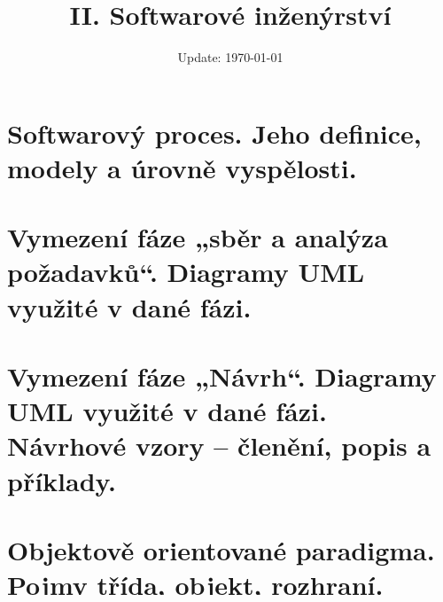 \documentclass[11pt]{article}
\title{\textbf{II. Softwarové inženýrství}}
\date{\small\vspace{-9ex}Update: \today}
\begin{document}
\maketitle
\setcounter{tocdepth}{1}
\tableofcontents
\pagebreak

\section{Softwarový proces. Jeho definice, modely a úrovně vyspělosti.}


\pagebreak
\section{Vymezení fáze „sběr a analýza požadavků“. Diagramy UML využité v dané fázi.}


\pagebreak
\section{Vymezení fáze „Návrh“. Diagramy UML využité v dané fázi. Návrhové vzory – členění, popis a příklady.}


\pagebreak
\section{Objektově orientované paradigma. Pojmy třída, objekt, rozhraní. Základní vlastnosti objektu a vztah ke třídě. Základní vztahy mezi třídami a rozhraními. Třídní vs. instanční vlastnosti.}


\pagebreak
\section{Mapování UML diagramů na zdrojový kód.}


\pagebreak
\section{Správa paměti (v jazycích C/C++, JAVA, C\#, Python), virtuální stroj, podpora paralelního zpracování a vlákna.}


\pagebreak
\section{Zpracování chyb v moderních programovacích jazycích, princip datových proudů – pro vstup a výstup. Rozdíl mezi znakově a bytově orientovanými datovými proudy.}


\pagebreak
\section{Jazyk UML – typy diagramů a jejich využití v rámci vývoje.}

\end{document}
